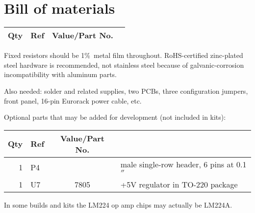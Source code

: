 
%
%
%
%
%
%

\onecolumn
\chapter{Bill of materials}\label{cha:bom}

{\centering
{}

\begin{longtable}{rp{1.4in}cp{2.9in}}
  \textbf{Qty} & \textbf{Ref} & \textbf{Value/Part No.} & \\ \hline \endhead

\end{longtable}\par}

Fixed resistors should be 1\%\ metal film throughout.
RoHS-certified zinc-plated steel hardware is recommended, not stainless
steel because of galvanic-corrosion incompatibility with aluminum parts.

Also needed:  solder and related supplies, two PCBs, three configuration
jumpers, front panel, 16-pin Eurorack power cable, etc.

Optional parts that may be added for development (not included in kits):

{\centering
\begin{longtable}{rp{1.4in}cp{2.9in}}
  \textbf{Qty} & \textbf{Ref} & \textbf{Value/Part No.} & \\ \hline \endhead
  1 & \raggedright P4 &  & male single-row header, 6 pins at 0.1$''$ \\
  1 & \raggedright U7 & 7805 & +5V regulator in TO-220 package \\
\end{longtable}\par}

In some builds and kits the LM224 op amp chips may actually be LM224A.

\twocolumn
